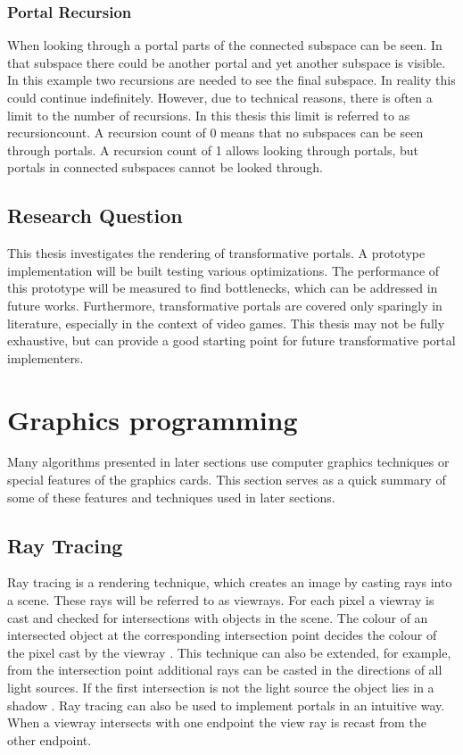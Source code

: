 \subsection{Portal Recursion}
When looking through a portal parts of the connected subspace can be seen. In that subspace there could be another portal and yet another subspace is visible. In this example two recursions are needed to see the final subspace. In reality this could continue indefinitely. However, due to technical reasons, there is often a limit to the number of recursions. In this thesis this limit is referred to as \gls{recursioncount}. A recursion count of 0 means that no subspaces can be seen through portals. A recursion count of 1 allows looking through portals, but portals in connected subspaces cannot be looked through.

\section{Research Question}


This thesis investigates the rendering of transformative portals. A prototype implementation will be built testing various optimizations. The performance of this prototype will be measured to find bottlenecks, which can be addressed in future works. Furthermore, transformative portals are covered only sparingly in literature, especially in the context of video games. This thesis may not be fully exhaustive, but can provide a good starting point for future transformative portal implementers.


\chapter{Graphics programming}

Many algorithms presented in later sections use computer graphics techniques or special features of the graphics cards. This section serves as a quick summary of some of these features and techniques used in later sections. 


\section{Ray Tracing}
Ray tracing is a rendering technique, which creates an image by casting rays into a scene. These rays will be referred to as \glspl{viewray}. For each pixel a \gls{viewray} is cast and checked for intersections with objects in the scene. The colour of an intersected object at the corresponding intersection point decides the colour of the pixel cast by the \gls{viewray} \cite{bungartz:2002:einfuhrung}. This technique can also be extended, for example, from the intersection point additional rays can be casted in the directions of all light sources. If the first intersection is not the light source the object lies in a shadow \cite{whitted:2005:improved}. Ray tracing can also be used to implement portals in an intuitive way. When a \gls{viewray} intersects with one \gls{endpoint} the view ray is recast from the other \gls{endpoint}.

